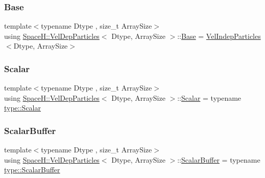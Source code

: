 \subsubsection{\texorpdfstring{Base}{Base}}
{\footnotesize\ttfamily template$<$typename Dtype , size\+\_\+t Array\+Size$>$ \\
using \mbox{\hyperlink{class_space_h_1_1_vel_dep_particles}{Space\+H\+::\+Vel\+Dep\+Particles}}$<$ Dtype, Array\+Size $>$\+::\mbox{\hyperlink{class_space_h_1_1_vel_dep_particles_a811be78cacdfc2138249181d2c879c3e}{Base}} =  \mbox{\hyperlink{class_space_h_1_1_vel_indep_particles}{Vel\+Indep\+Particles}}$<$Dtype, Array\+Size$>$}

\mbox{\label{class_space_h_1_1_vel_dep_particles_ad0f03dd9e570b54c5c6c03589981f6b5}} 
\subsubsection{\texorpdfstring{Scalar}{Scalar}}
{\footnotesize\ttfamily template$<$typename Dtype , size\+\_\+t Array\+Size$>$ \\
using \mbox{\hyperlink{class_space_h_1_1_vel_dep_particles}{Space\+H\+::\+Vel\+Dep\+Particles}}$<$ Dtype, Array\+Size $>$\+::\mbox{\hyperlink{class_space_h_1_1_vel_indep_particles_aeb47d8131b30ed790320ff634f0d6af1}{Scalar}} =  typename \mbox{\hyperlink{struct_space_h_1_1_proto_type_af3c8245d83d9db64749882920de5c274}{type\+::\+Scalar}}}

\mbox{\label{class_space_h_1_1_vel_dep_particles_ae9a8f53480bc6284b90a7a48f49bb7d0}} 
\subsubsection{\texorpdfstring{Scalar\+Buffer}{ScalarBuffer}}
{\footnotesize\ttfamily template$<$typename Dtype , size\+\_\+t Array\+Size$>$ \\
using \mbox{\hyperlink{class_space_h_1_1_vel_dep_particles}{Space\+H\+::\+Vel\+Dep\+Particles}}$<$ Dtype, Array\+Size $>$\+::\mbox{\hyperlink{class_space_h_1_1_vel_indep_particles_abca40159a816385790d5a6fd19c1dc6d}{Scalar\+Buffer}} =  typename \mbox{\hyperlink{struct_space_h_1_1_proto_type_a62c491884996da10377d348a5aabad86}{type\+::\+Scalar\+Buffer}}}

